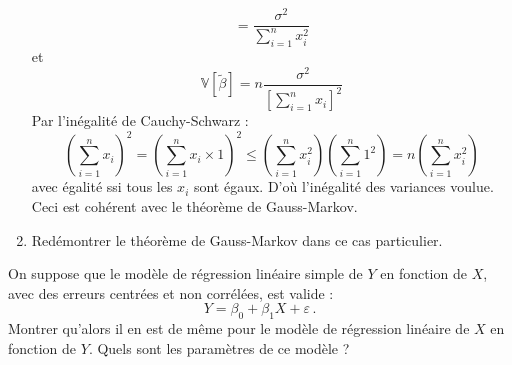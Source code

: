 \documentclass{../headers/td_upc}
\providecommand{\1}{\mathds{1}}
\begin{document}
\begin{enumerate}
{\[		= \frac{\sigma^2}{\sum_{i=1}^{n} x_{i}^{2}}
		\]
		et
		\[
		\mathbb{V}[\tilde\beta] 
		= n\frac{\sigma^2}{[\sum_{i=1}^{n} x_{i}]^{2}}
		\]
		Par l'inégalité de Cauchy-Schwarz :
		\[
		\left(\sum_{i=1}^{n} x_{i}\right)^2
		= \left(\sum_{i=1}^{n} x_{i} \times 1\right)^2
		\leq \left(\sum_{i=1}^{n} x_{i}^2\right) \left(\sum_{i=1}^{n} 1^2\right)
		= n \left(\sum_{i=1}^{n} x_{i}^2\right)
		\]
		avec égalité ssi tous les $x_i$ sont égaux.
		D'où l'inégalité des variances voulue.
		Ceci est cohérent avec le théorème de Gauss-Markov.
		}
		\item Redémontrer le théorème de Gauss-Markov dans ce cas particulier.
	\end{enumerate}
	
	
	\cor{\newpage}
	
	\exo{}
	On suppose que le modèle de régression linéaire simple de $Y$ en fonction de $X$, 
	avec des erreurs centrées et non corrélées, est valide :
	\[
	Y=\beta_{0} + \beta_{1} X + \varepsilon\,.
	\]
	Montrer qu'alors il en est de même pour le modèle de régression linéaire de $X$ en fonction de $Y$. 
	Quels sont les paramètres de ce modèle ?
	
	
	\cor{\newpage}
	
\end{document}
